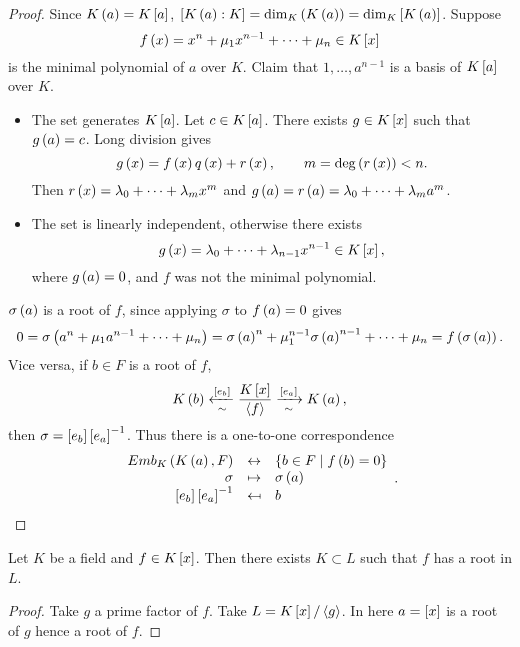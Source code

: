 \begin{proof}
Since $ K\rb{a} = K\sb{a} $, $ \sb{K\rb{a} : K} = \dim_K\rb{K\rb{a}} = \dim_K\sb{K\rb{a}} $. Suppose
$$ f\rb{x} = x^n + \mu_1x^{n - 1} + \dots + \mu_n \in K\sb{x} $$
is the minimal polynomial of $ a $ over $ K $. Claim that $ 1, \dots, a^{n - 1} $ is a basis of $ K\sb{a} $ over $ K $.
\begin{itemize}
\item The set generates $ K\sb{a} $. Let $ c \in K\sb{a} $. There exists $ g \in K\sb{x} $ such that $ g\rb{a} = c $. Long division gives
$$ g\rb{x} = f\rb{x}q\rb{x} + r\rb{x}, \qquad m = \deg\rb{r\rb{x}} < n. $$
Then $ r\rb{x} = \lambda_0 + \dots + \lambda_mx^m $ and $ g\rb{a} = r\rb{a} = \lambda_0 + \dots + \lambda_ma^m $.
\item The set is linearly independent, otherwise there exists
$$ g\rb{x} = \lambda_0 + \dots + \lambda_{n - 1}x^{n- 1} \in K\sb{x}, $$
where $ g\rb{a} = 0 $, and $ f $ was not the minimal polynomial.
\end{itemize}
$ \sigma\rb{a} $ is a root of $ f $, since applying $ \sigma $ to $ f\rb{a} = 0 $ gives
$$ 0 = \sigma\rb{a^n + \mu_1a^{n - 1} + \dots + \mu_n} = \sigma\rb{a}^n + \mu_1^{n - 1}\sigma\rb{a}^{n - 1} + \dots + \mu_n = f\rb{\sigma\rb{a}}. $$
Vice versa, if $ b \in F $ is a root of $ f $,
$$ K\rb{b} \xleftarrow[\sim]{\sb{e_b}} \dfrac{K\sb{x}}{\ab{f}} \xrightarrow[\sim]{\sb{e_a}} K\rb{a}, $$
then $ \sigma = \sb{e_b}\sb{e_a}^{-1} $. Thus there is a one-to-one correspondence
$$
\begin{array}{rcl}
Emb_K\rb{K\rb{a}, F} & \leftrightarrow & \cb{b \in F \mid f\rb{b} = 0} \\
\sigma & \mapsto & \sigma\rb{a} \\
\sb{e_b}\sb{e_a}^{-1} & \mapsfrom & b
\end{array}.
$$
\end{proof}

\begin{corollary}
Let $ K $ be a field and $ f \in K\sb{x} $. Then there exists $ K \subset L $ such that $ f $ has a root in $ L $.
\end{corollary}

\begin{proof}
Take $ g $ a prime factor of $ f $. Take $ L = K\sb{x} / \ab{g} $. In here $ a = \sb{x} $ is a root of $ g $ hence a root of $ f $.
\end{proof}

